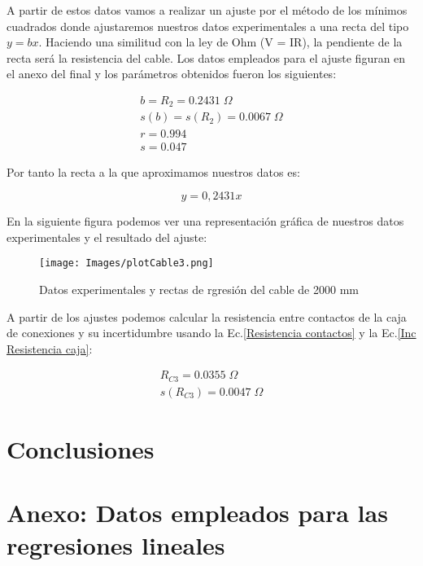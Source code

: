 \documentclass[a4paper,12pt,titlepage]{article}
\begin{document}
A partir de estos datos vamos a realizar un ajuste por el método de los mínimos cuadrados donde ajustaremos nuestros datos experimentales a una recta del tipo $y = bx$. Haciendo una similitud con la ley de Ohm (V = IR), la pendiente de la recta será la resistencia del cable. Los datos empleados para el ajuste figuran en el anexo del final y los parámetros obtenidos fueron los siguientes:

\begin{equation}
    \begin{gathered}
        b = R_{2} = 0.2431 \; \Omega \\
        s(b) = s(R_{2}) = 0.0067\; \Omega \\
        r =    0.994 \\
        s =  0.047
    \end{gathered}
\end{equation}

Por tanto la recta a la que aproximamos nuestros datos es:

\begin{equation}
    y = 0,2431x
\end{equation}

En la siguiente figura podemos ver una representación gráfica de nuestros datos experimentales y el resultado del ajuste:

\begin{figure}[h!]
    \centering
    \texttt{[image: Images/plotCable3.png]}
    \caption{Datos experimentales y rectas de rgresión del cable de 2000 mm}
\end{figure}

A partir de los ajustes podemos calcular la resistencia entre contactos de la caja de conexiones y su incertidumbre usando la Ec.\ref{Resistencia contactos} y la Ec.\ref{Inc Resistencia caja}:

\begin{equation}
    \begin{gathered}
        R_{C3} = 0.0355 \; \Omega\\
        s(R_{C3}) = 0.0047\; \Omega
    \end{gathered}
\end{equation}




\newpage

\section{Conclusiones}


\section{Anexo: Datos empleados para las regresiones lineales}
\end{document}

